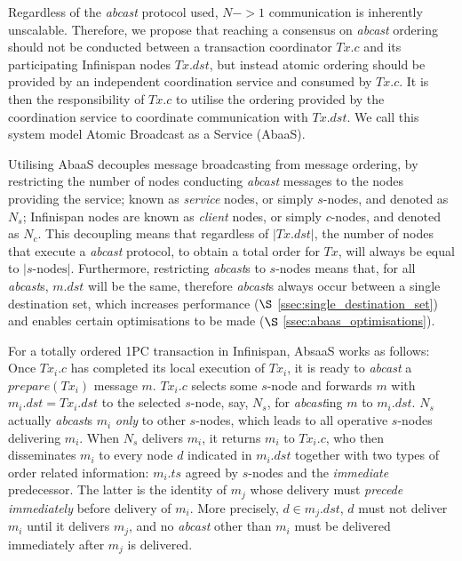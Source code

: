 Regardless of the \emph{abcast} protocol used, $N->1$ communication is inherently unscalable.  Therefore, we propose that reaching a consensus on \emph{abcast} ordering should not be conducted between a transaction coordinator $Tx.c$ and its participating Infinispan nodes $Tx.dst$, but instead atomic ordering should be provided by an independent coordination service and consumed by $Tx.c$.  It is then the responsibility of $Tx.c$ to utilise the ordering provided by the coordination service to coordinate communication with $Tx.dst$.  We call this system model Atomic Broadcast as a Service (\textsf{AbaaS}).  

Utilising \textsf{AbaaS} decouples message broadcasting from message ordering, by restricting the number of nodes conducting \emph{abcast} messages to the nodes providing the service; known as \emph{service} nodes, or simply $s$-nodes, and denoted as $N_s$; Infinispan nodes are known as \emph{client} nodes, or simply $c$-nodes, and denoted as $N_c$.  This decoupling means that regardless of $\left\vert Tx.dst \right\vert$, the number of nodes that execute a \emph{abcast} protocol, to obtain a total order for $Tx$, will always be equal to $\left\vert s\text{-nodes}\right\vert$.  Furthermore, restricting \emph{abcast}s to $s$-nodes means that, for all \emph{abcast}s, $m.dst$ will be the same, therefore \emph{abcast}s always occur between a single destination set, which increases performance ($\S$ \ref{ssec:single_destination_set}) and enables certain optimisations to be made ($\S$ \ref{ssec:abaas_optimisations}).  

For a totally ordered 1PC transaction in Infinispan, \textsf{AbsaaS} works as follows: Once $Tx_i.c$ has completed its local execution of $Tx_i$, it is ready to \emph{abcast} a $prepare(Tx_i)$ message $m$.  $Tx_i.c$ selects some $s$-node and forwards $m$ with $m_i.dst = Tx_i.dst$ to the selected $s$-node, say, $N_s$, for \emph{abcast}ing $m$ to $m_i.dst$. $N_s$ actually \emph{abcast}s $m_i$ \emph{only} to other $s$-nodes, which leads to all operative $s$-nodes delivering $m_i$. When $N_s$ delivers $m_i$, it returns $m_i$ to $Tx_i.c$, who then disseminates $m_i$ to every node $d$ indicated in $m_i.dst$ together with two types of order related information: $m_i.ts$ agreed by $s$-nodes and the \emph{immediate} predecessor. The latter is the identity of $m_j$ whose delivery must \emph{precede} \emph{immediately} before delivery of $m_i$. More precisely, $d \in m_j.dst$, $d$ must not deliver $m_i$ until it delivers $m_j$, and no \emph{abcast} other than $m_i$ must be delivered immediately after $m_j$ is delivered.

